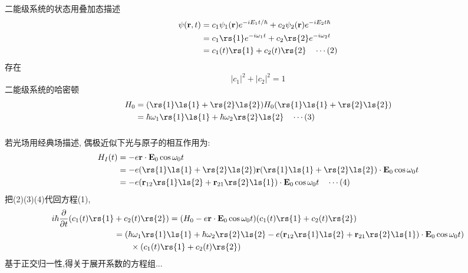 \begin{frame} 
\frametitle{}
{\Bullet} 二能级系统的状态用叠加态描述
       \[ \begin{aligned}
          \psi(\mathbf{r},t) & = c_1 \psi_1(\mathbf{r})e ^{-i E_1 t /\hbar} + c_2 \psi_2(\mathbf{r})e ^{-i E_2 t \hbar}  \\
          &= c_1 \rs{1} e ^{-i \omega_1 t} + c_2 \rs{2} e ^{-i \omega_2 t}  \\
          &= c_1(t) \rs{1}  + c_2(t) \rs{2} \quad \cdots (2)
       \end{aligned}\] 
    存在
       \[ \left|c_1 \right|^2 + \left|c_2\right|^2 =1 \] 
{\Bullet} 二能级系统的哈密顿
    \[\begin{aligned}
    H_0 &= (\rs{1} \ls{1} + \rs{2} \ls{2})H_0(\rs{1} \ls{1} + \rs{2} \ls{2})    \\ 
    &= \hbar \omega_1 \rs{1} \ls{1} + \hbar \omega_2 \rs{2} \ls{2}  \quad \cdots (3)
    \end{aligned} \]    
\end{frame}

\begin{frame} 
\frametitle{}
    若光场用经典场描述, 偶极近似下光与原子的相互作用为:
    \[\begin{aligned}
       H_I(t) & = - e \mathbf{r}\cdot \mathbf{E}_0\cos \omega_0 t   \\
       &= - e  (\rs{1} \ls{1} + \rs{2} \ls{2}) \mathbf{r}(\rs{1} \ls{1} + \rs{2} \ls{2})\cdot \mathbf{E}_0\cos \omega_0 t  \\ 
       &= -e(\mathbf{r}_{12} \rs{1} \ls{2}+ \mathbf{r}_{21} \rs{2} \ls{1})\cdot \mathbf{E}_0\cos \omega_0 t \quad \cdots (4)
    \end{aligned} \]
    把(2)(3)(4)代回方程(1), 
    \[ \begin{aligned}
        i \hbar \frac{\partial }{\partial t} (c_1(t) \rs{1}  &+ c_2(t) \rs{2}) = (H_0 - e \mathbf{r}\cdot \mathbf{E}_0\cos \omega_0 t)   (c_1(t) \rs{1}  + c_2(t) \rs{2})\\
        &= (\hbar \omega_1 \rs{1} \ls{1} + \hbar \omega_2 \rs{2} \ls{2} - e(\mathbf{r}_{12} \rs{1} \ls{2}+ \mathbf{r}_{21} \rs{2} \ls{1})\cdot \mathbf{E}_0\cos \omega_0 t)\\ 
        &{\hspace*{2em}} \times (c_1(t) \rs{1}  + c_2(t) \rs{2})
    \end{aligned}\] 
    基于正交归一性,得关于展开系数的方程组... 
\end{frame}

